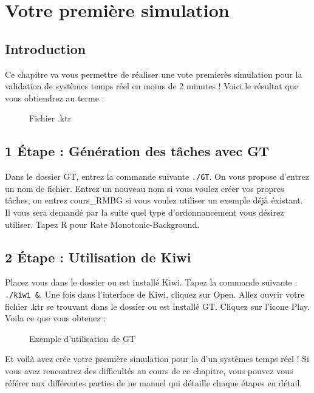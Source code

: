 \section{Votre première simulation}
\subsection{Introduction}
Ce chapitre va vous permettre de réaliser une vote premierès simulation pour la validation de systèmes temps réel en moins de 2 minutes  \smiley ! Voici le résultat que vous obtiendrez au terme : 
\begin{figure}[htbp]
  \centering
  \caption{Fichier .ktr}
  \label{fig:dnuages}
\end{figure}

\subsection{1 \'Etape : Génération des tâches avec GT} 
Dans le dossier GT, entrez la commande suivante \verb+./GT+. On vous propose d'entrez un nom de fichier. Entrez un nouveau nom si vous voulez créer vos propres tâches, ou entrez cours\_RMBG si vous voulez utiliser un exemple déjà éxistant. Il vous sera  demandé par la suite quel type d'ordonnancement vous désirez utiliser. Tapez R pour Rate Monotonic-Background. 

\subsection{2 \'Etape : Utilisation de Kiwi}
Placez vous dans le dossier ou est installé Kiwi. Tapez la commande suivante  : \verb+./kiwi &+. Une fois dans l'interface de Kiwi, cliquez sur Open. Allez ouvrir votre fichier .ktr se trouvant dans le dossier ou est installé GT. Cliquez sur l'îcone Play. Voila ce que vous obtenez :  
\begin{figure}[htbp]
  \centering
  \caption{Exemple d'utilisation de GT}
  \label{fig:commandes}
\end{figure} 


Et voilà avez crée votre première simulation pour la d'un systèmes temps réel  ! Si vous avez rencontrez des difficultés au cours de ce chapitre, vous pouvez vous référer aux différentes parties de ne manuel qui détaille chaque étapes en détail.

